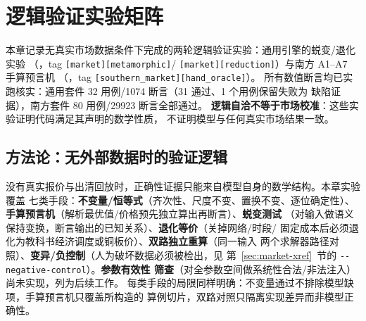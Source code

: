 \section{逻辑验证实验矩阵}\label{sec:logic-verification}

\begin{theorynote}
本章记录无真实市场数据条件下完成的两轮逻辑验证实验：通用引擎的蜕变/退化实验
（，tag \texttt{[market][metamorphic]}/
\texttt{[market][reduction]}）与南方 A1--A7 手算预言机
（，tag \texttt{[southern\_market][hand\_oracle]}）。
所有数值断言均已实跑核实：通用套件 32 用例/1074 断言（31 通过、1 个用例保留失败为
缺陷证据），南方套件 80 用例/29923 断言全部通过。
\textbf{逻辑自洽不等于市场校准}：这些实验证明代码满足其声明的数学性质，
不证明模型与任何真实市场结果一致。
\end{theorynote}

\subsection{方法论：无外部数据时的验证逻辑}
没有真实报价与出清回放时，正确性证据只能来自模型自身的数学结构。本章实验覆盖
七类手段：\textbf{不变量/恒等式}（齐次性、尺度不变、置换不变、逐位确定性）、
\textbf{手算预言机}（解析最优值/价格预先独立算出再断言）、\textbf{蜕变测试}
（对输入做语义保持变换，断言输出的已知关系）、\textbf{退化等价}（关掉网络/时段/
固定成本后必须退化为教科书经济调度或铜板价）、\textbf{双路独立重算}（同一输入
两个求解器路径对照）、\textbf{变异/负控制}（人为破坏数据必须被检出，见
第~\ref{sec:market-xref}~节的 \texttt{-{}-negative-control}）。\textbf{参数有效性
筛查}（对全参数空间做系统性合法/非法注入）尚未实现，列为后续工作。
每类手段的局限同样明确：不变量通过不排除模型缺项，手算预言机只覆盖所构造的
算例切片，双路对照只隔离实现差异而非模型正确性。

